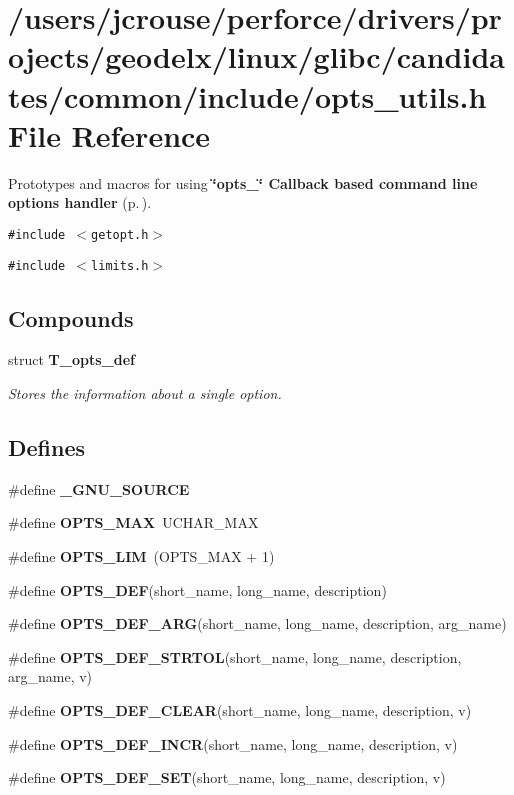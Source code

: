 \section{/users/jcrouse/perforce/drivers/projects/geodelx/linux/glibc/candidates/common/include/opts\_\-utils.h File Reference}
\label{opts__utils_8h}
Prototypes and macros for using {\bf \char`\"{}opts\_\-\char`\"{} Callback based command line options handler} {\rm (p.\,\pageref{group__opts})}. 


{\tt \#include $<$getopt.h$>$}\par
{\tt \#include $<$limits.h$>$}\par
\subsection*{Compounds}
\begin{CompactItemize}
\item 
struct {\bf T\_\-opts\_\-def}
\begin{CompactList}\small\item\em Stores the information about a single option.\item\end{CompactList}\end{CompactItemize}
\subsection*{Defines}
\begin{CompactItemize}
\item 
\#define {\bf \_\-GNU\_\-SOURCE}
\item 
\#define {\bf OPTS\_\-MAX}\ UCHAR\_\-MAX
\item 
\#define {\bf OPTS\_\-LIM}\ (OPTS\_\-MAX + 1)
\item 
\#define {\bf OPTS\_\-DEF}(short\_\-name, long\_\-name, description)
\item 
\#define {\bf OPTS\_\-DEF\_\-ARG}(short\_\-name, long\_\-name, description, arg\_\-name)
\item 
\#define {\bf OPTS\_\-DEF\_\-STRTOL}(short\_\-name, long\_\-name, description, arg\_\-name, v)
\item 
\#define {\bf OPTS\_\-DEF\_\-CLEAR}(short\_\-name, long\_\-name, description, v)
\item 
\#define {\bf OPTS\_\-DEF\_\-INCR}(short\_\-name, long\_\-name, description, v)
\item 
\#define {\bf OPTS\_\-DEF\_\-SET}(short\_\-name, long\_\-name, description, v)
\end{CompactItemize}
